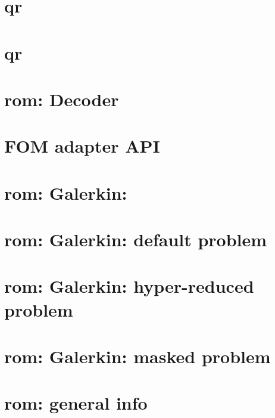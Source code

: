 \let\mypdfximage\pdfximage\def\pdfximage{\immediate\mypdfximage}\documentclass[twoside]{book}
\newcommand{\+}{\discretionary{\mbox{\scriptsize$\hookleftarrow$}}{}{}}
\begin{document}
\chapter{qr}
\label{md_pages_components_qr_copy}

\chapter{qr}
\label{md_pages_components_qr}

\chapter{rom\+: Decoder}
\label{md_pages_components_rom_decoder}

\chapter{FOM adapter API}
\label{md_pages_components_rom_fom_apis}

\chapter{rom\+: Galerkin\+:}
\label{md_pages_components_rom_galerkin}

\chapter{rom\+: Galerkin\+: default problem}
\label{md_pages_components_rom_galerkin_default}

\chapter{rom\+: Galerkin\+: hyper-\/reduced problem}
\label{md_pages_components_rom_galerkin_hypred}

\chapter{rom\+: Galerkin\+: masked problem}
\label{md_pages_components_rom_galerkin_masked}

\chapter{rom\+: general info}
\label{md_pages_components_rom_general}

\end{document}
